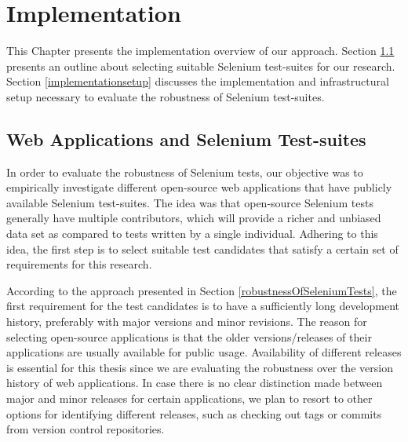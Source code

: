 \chapter{Implementation}
\label{Chapter4}

This Chapter presents the implementation overview of our approach. Section \ref{selectingCandidates} presents an outline about selecting suitable Selenium test-suites for our research. Section \ref{implementationsetup} discusses the implementation and infrastructural setup necessary to evaluate the robustness of Selenium test-suites. 


\section{Web Applications and Selenium Test-suites}
\label{selectingCandidates}
In order to evaluate the robustness of Selenium tests, our objective was to empirically investigate different open-source web applications that have publicly available Selenium test-suites. The idea was that open-source Selenium tests generally have multiple contributors, which will provide a richer and unbiased data set as compared to tests written by a single individual. Adhering to this idea, the first step is to select suitable test candidates that satisfy a certain set of requirements for this research. 

According to the approach presented in Section \ref{robustnessOfSeleniumTests}, the first requirement for the test candidates is to have a sufficiently long development history, preferably with major versions and minor revisions. The reason for selecting open-source applications is that the older versions/releases of their applications are usually available for public usage. Availability of different releases is essential for this thesis since we are evaluating the robustness over the version history of web applications. In case there is no clear distinction made between major and minor releases for certain applications, we plan to resort to other options for identifying different releases, such as checking out tags or commits from version control repositories. 

